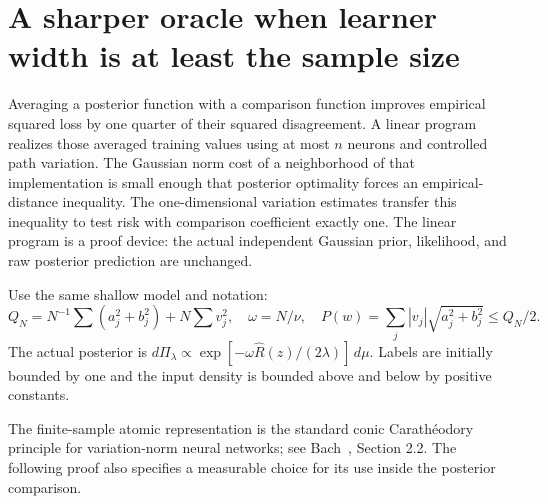 \section{A sharper oracle when learner width is at least the sample size}
\label{sec:empirical-midpoint}
Averaging a posterior function with a comparison function improves
empirical squared loss by one quarter of their squared disagreement.
A linear program realizes those averaged training values using at
most $n$ neurons and controlled path variation. The Gaussian norm
cost of a neighborhood of that implementation is small enough that
posterior optimality forces an empirical-distance inequality.
The one-dimensional variation estimates transfer this inequality to
test risk with comparison coefficient exactly one. The linear program
is a proof device: the actual independent Gaussian prior, likelihood,
and raw posterior prediction are unchanged.

Use the same shallow model and notation:
\[
 Q_N=N^{-1}\sum(a_j^2+b_j^2)+N\sum v_j^2,\quad
 \omega=N/\nu,\quad P(w)=\sum_j|v_j|\sqrt{a_j^2+b_j^2}\le Q_N/2.
\]
The actual posterior is
$d\Pi_\lambda\propto
 \exp[-\omega\widehat R(z)/(2\lambda)]\,d\mu$.
Labels are initially bounded by one and the input density is bounded
above and below by positive constants.

The finite-sample atomic representation is the standard conic
Carath\'eodory principle for variation-norm neural networks; see
Bach~\cite{bach-convex}, Section 2.2. The following proof also specifies
a measurable choice for its use inside the posterior comparison.


